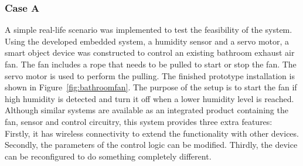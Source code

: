 
\subsubsection*{Case A}

A simple real-life scenario was implemented to test the feasibility of the system. Using the developed embedded system, a humidity sensor and a servo motor, a smart object device was constructed to control an existing bathroom exhaust air fan. The fan includes a rope that needs to be pulled to start or stop the fan. The servo motor is used to perform the pulling. The finished prototype installation is shown in Figure~\ref{fig:bathroomfan}. The purpose of the setup is to start the fan if high humidity is detected and turn it off when a lower humidity level is reached. Although similar systems are available as an integrated product containing the fan, sensor and control circuitry, this system provides three extra features: Firstly, it has wireless connectivity to extend the functionality with other devices. Secondly, the parameters of the control logic can be modified. Thirdly, the device can be reconfigured to do something completely different.

